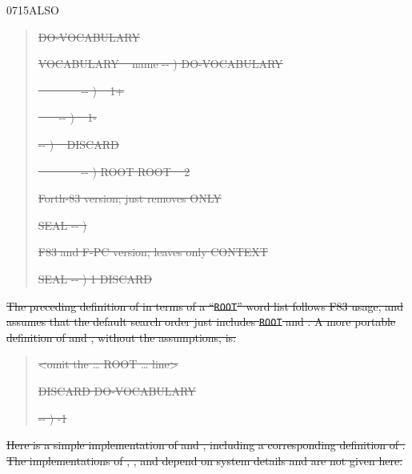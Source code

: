 \begin{worddef}{0715}{ALSO}
\begin{rationale}
\begin{quote}
		\sout{ 
		 \word{,} DO-VOCABULARY}

		\sout{\word{:} VOCABULARY ~ name -{}- )
			  \word{,} DO-VOCABULARY
		\word{;}}

		\sout{\word{:}  ~~~~~~~ -{}- )
			 ~ 
			 1+ 
		\word{;}}

		\sout{\word{:}  ~~~ -{}- )
			 ~ 
			 1- 
		\word{;}}

		\sout{\word{:}   -{}- )
			 ~ 
			 DISCARD
		\word{;}}

		\sout{\word{:}  ~~~~~~~ -{}- )
			ROOT ROOT ~ 2 
		\word{;}}

		\sout{ Forth-83 version; just removes ONLY}

		\sout{\word{:} SEAL  -{}- )
			 
			 
		\word{;}}

		\sout{ F83 and F-PC version; leaves only CONTEXT}

		\sout{\word{:} SEAL  -{}- )
			 
			1  DISCARD
		\word{;}}
		\end{quote}

\sout{%
		The preceding definition of  in terms of a
		``\texttt{ROOT}'' word list follows F83 usage, and assumes
		that the default search order just includes \texttt{ROOT} and
		. A more portable definition of  and
		, without the assumptions, is:}

		\begin{quote}\ttfamily
		\sout{<omit the {\ldots}
			  ROOT
		{\ldots} line>}

		\sout{  
			 \word[core]{,} DISCARD DO-VOCABULARY}

		\sout{\word[core]{:}   -{}- )
			-1 
		\word[core]{;}}
		\end{quote}

\sout{%
		Here is a simple implementation of  and
		, including a corresponding definition of
		. The implementations of ,
		,  and
		 depend on system details and are not given
		here.}


\end{rationale}
\end{worddef}
